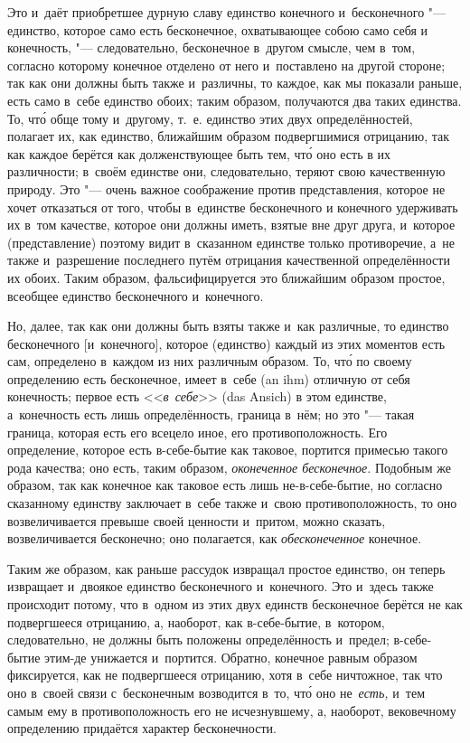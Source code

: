 Это и~даёт приобретшее дурную славу единство конечного и~бесконечного
"--- единство, которое само есть бесконечное, охватывающее собою само себя и
конечность, "--- следовательно, бесконечное в~другом смысле, чем в~том,
согласно которому конечное отделено от него и~поставлено на другой стороне;
так как они должны быть также и~различны, то каждое, как мы показали
раньше, есть само в~себе единство обоих; таким образом, получаются два
таких единства. То, чт\'{о} обще тому и~другому, т.~е. единство этих двух
определённостей, полагает их, как единство, ближайшим образом подвергшимися
отрицанию, так как каждое берётся как долженствующее быть тем, чт\'{о} оно есть
в их различности; в~своём единстве они, следовательно, теряют свою
качественную природу. Это "--- очень важное соображение против представления,
которое не хочет отказаться от того, чтобы в~единстве бесконечного и
конечного удерживать их в~том качестве, которое они должны иметь, взятые
вне друг друга, и~которое (представление) поэтому видит в~сказанном
единстве только противоречие, а~не также и~разрешение последнего путём
отрицания качественной определённости их обоих. Таким образом,
фальсифицируется это ближайшим образом простое, всеобщее единство
бесконечного и~конечного.

Но, далее, так как они должны быть взяты также и~как различные, то единство
бесконечного [и~конечного], которое (единство) каждый из этих моментов есть
сам, определено в~каждом из них различным образом. То, чт\'{о} по своему
определению есть бесконечное, имеет в~себе (an ihm) отличную от себя
конечность; первое есть <<{\em в~себе}>> (das Ansich) в
этом единстве, а~конечность есть лишь определённость, граница в~нём; но это
"--- такая граница, которая есть его всецело иное, его
противоположность. Его определение, которое есть в-себе-бытие как таковое,
портится примесью такого рода качества; оно есть, таким образом,
{\em оконеченное бесконечное}. Подобным же образом, так
как конечное как таковое есть лишь не-в-себе-бытие, но согласно сказанному
единству заключает в~себе также и~свою противоположность, то оно
возвеличивается превыше своей ценности и~притом, можно сказать,
возвеличивается бесконечно; оно полагается, как
{\em обесконеченное} конечное.

Таким же образом, как раньше рассудок извращал простое единство, он
теперь извращает и~двоякое единство бесконечного и~конечного.
Это и~здесь также происходит потому, что в~одном из этих двух единств
бесконечное берётся не как подвергшееся отрицанию, а, наоборот, как
в-себе-бытие, в~котором, следовательно, не должны быть положены
определённость и~предел; в-себе-бытие этим-де унижается и~портится.
Обратно, конечное равным образом фиксируется, как не подвергшееся
отрицанию, хотя в~себе ничтожное, так что оно в~своей связи с~бесконечным
возводится в~то, чт\'{о} оно не~{\em есть,} и~тем самым ему
в противоположность его не исчезнувшему, а, наоборот, вековечному
определению придаётся характер бесконечности.

